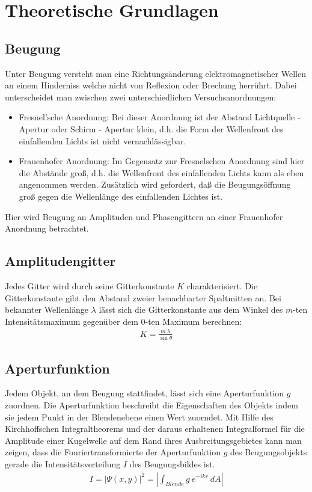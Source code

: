 \documentclass[12pt]{article}
\begin{document}
\newpage

\section{Theoretische Grundlagen}

\subsection{Beugung}
Unter Beugung versteht man eine Richtungsänderung elektromagnetischer Wellen an einem Hinderniss welche nicht von Reflexion oder Brechung herrührt. Dabei unterscheidet man zwischen zwei unterschiedlichen Versuchsanordnungen:
\begin{itemize}
 \item Fresnel’sche Anordnung: Bei dieser Anordnung ist der Abstand Lichtquelle - Apertur oder Schirm - Apertur
  klein, d.h. die Form der Wellenfront des einfallenden Lichts ist nicht vernachlässigbar.
 \item Frauenhofer Anordnung: Im Gegensatz zur Fresnelschen Anordnung sind hier die Abstände
  groß, d.h. die Wellenfront des einfallenden Lichts kann als eben angenommen werden. Zusätzlich 
  wird gefordert, daß die Beugungsöffnung groß gegen die Wellenlänge des einfallenden Lichtes ist.
\end{itemize}
Hier wird Beugung an Amplituden und Phasengittern an einer Frauenhofer Anordnung betrachtet.

\subsection{Amplitudengitter}
Jedes Gitter wird durch seine Gitterkonstante $K$ charakterisiert. Die Gitterkonstante gibt den Abstand zweier benachbarter Spaltmitten an.
Bei bekannter Wellenlänge $\lambda$ lässt sich die Gitterkonstante aus dem Winkel des $m$-ten Intensitätsmaximum gegenüber dem 0-ten Maximum berechnen:
\begin{align}
\label{gitterkonstante} K = \frac{m \ \lambda}{\sin{\theta}}
\end{align}

\subsection{Aperturfunktion}
Jedem Objekt, an dem Beugung stattfindet, lässt sich eine Aperturfunktion $g$ zuordnen. Die Aperturfunktion beschreibt die Eigenschaften des Objekts indem
sie jedem Punkt in der Blendenebene einen Wert zuorndet. Mit Hilfe des Kirchhoffschen Integraltheorems und der daraus erhaltenen Integralformel für die
Amplitude einer Kugelwelle auf dem Rand ihres Ausbreitungsgebietes kann man zeigen, dass die Fouriertransformierte der Aperturfunktion $g$ des
Beugungsobjekts gerade die Intensitätsverteilung $I$ des Beugungsbildes ist.
\begin{align}
 I = \lvert \Psi(x,y) \rvert^2 = \left\lvert \int_{Blende}{g \ e^{-ikr} \ dA} \right\rvert
\end{align}
\end{document}

